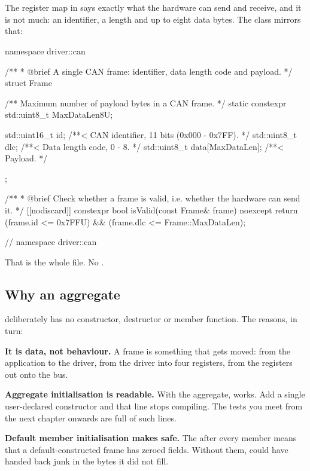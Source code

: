 \section{\texorpdfstring{}{driver::can::Frame}}
\label{sec:framecls}

The register map in  says exactly what the hardware can send and receive, and it is
not much: an identifier, a length and up to eight data bytes. The class mirrors that:

\begin{cppcode}
namespace driver::can
{
/**
 * @brief A single CAN frame: identifier, data length code and payload.
 */
struct Frame
{
    /** Maximum number of payload bytes in a CAN frame. */
    static constexpr std::uint8_t MaxDataLen{8U};

    std::uint16_t id{};               /**< CAN identifier, 11 bits (0x000 - 0x7FF). */
    std::uint8_t  dlc{};              /**< Data length code, 0 - 8. */
    std::uint8_t  data[MaxDataLen]{}; /**< Payload. */
};

/**
 * @brief Check whether a frame is valid, i.e. whether the hardware can send it.
 */
[[nodiscard]] constexpr bool isValid(const Frame& frame) noexcept
{
    return (frame.id <= 0x7FFU) && (frame.dlc <= Frame::MaxDataLen);
}

} // namespace driver::can
\end{cppcode}

That is the whole file. No .

\subsection{Why an aggregate}

 deliberately has no constructor, destructor or member function. The reasons, in turn:

\textbf{It is data, not behaviour.} A frame is something that gets moved: from the application to
the driver, from the driver into four registers, from the registers out onto the bus.

\textbf{Aggregate initialisation is readable.} With the aggregate,
 works. Add a single user-declared constructor and
that line stops compiling. The tests you meet from the next chapter onwards are full of such
lines.

\textbf{Default member initialisation makes  safe.} The \code{{}} after every
member means that a default-constructed frame has zeroed fields. Without them, 
could have handed back junk in the bytes it did not fill.


